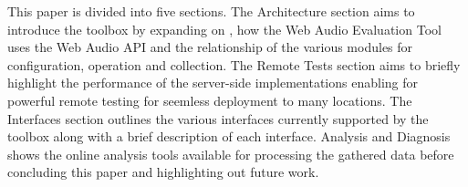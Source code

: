 \documentclass{sig-alternate}
\begin{document}

    This paper is divided into five sections. The Architecture section aims to introduce the toolbox by expanding on \cite{waet}, how the Web Audio Evaluation Tool uses the Web Audio API and the relationship of the various modules for configuration, operation and collection. The Remote Tests section aims to briefly highlight the performance of the server-side implementations enabling for powerful remote testing for seemless deployment to many locations. The Interfaces section outlines the various interfaces currently supported by the toolbox along with a brief description of each interface. Analysis and Diagnosis shows the online analysis tools available for processing the gathered data before concluding this paper and highlighting out future work.
\end{document}
